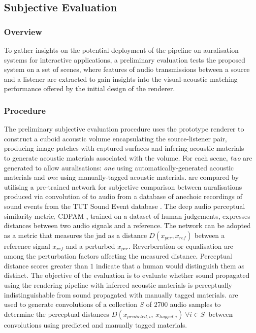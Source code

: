 \subsection{Subjective Evaluation}
\subsubsection{Overview}
To gather insights on the potential deployment of the pipeline on auralisation systems for interactive applications, a preliminary evaluation tests the proposed system on a set of scenes, where features of audio transmissions between a source and a listener are extracted to gain insights into the visual-acoustic matching performance offered by the initial design of the renderer. \par

\subsubsection{Procedure}
The preliminary subjective evaluation procedure uses the prototype renderer to construct a cuboid acoustic volume encapsulating the source-listener pair, producing image patches with captured surfaces and infering acoustic materials to generate acoustic materials associated with the volume. For each scene, \emph{two}  are generated to allow auralisations: \emph{one} using automatically-generated acoustic materials and \emph{one} using manually-tagged acoustic materials.  are compared by utilising a pre-trained network for subjective comparison between auralisations produced via convolution of  to audio from a database of anechoic recordings of sound events from the TUT Sound Event database \citep{sharath_adavanne_2018_1237752}. The deep audio perceptual similarity metric, CDPAM \citep{manocha2021cdpam}, trained on a dataset of human judgements, expresses distances between two audio signals and a reference. The network can be adopted as a metric that measures the \acrfull{jnd} as a distance $D(x_{per}, x_{ref})$ between a reference signal $x_{ref}$ and a perturbed $x_{per}$. Reverberation or equalisation are among the perturbation factors affecting the measured distance. Perceptual distance scores greater than $1$ indicate that a human would distinguish them as distinct. The objective of the evaluation is to evaluate whether sound propagated using the rendering pipeline with inferred acoustic materials is perceptually indistinguishable from sound propagated with manually tagged materials.  are used to generate convolutions of a collection $S$ of 2700 audio samples to determine the perceptual distances $D(x_{predicted, i},~x_{tagged, i})~\forall i \in S~$ between convolutions using predicted and manually tagged materials.\par

